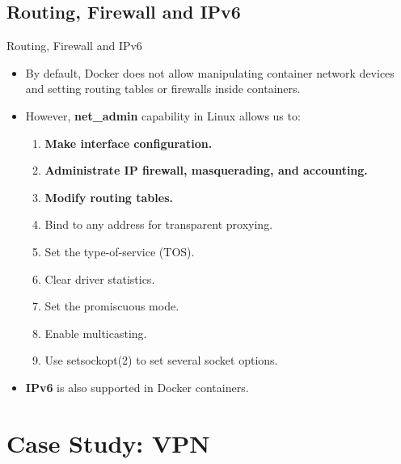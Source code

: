 \documentclass{beamer}
\begin{document}
\subsection{Routing, Firewall and IPv6}
\begin{frame}{Routing, Firewall and IPv6}
\begin{itemize}
\item By default, Docker does not allow manipulating container network devices and setting routing tables or firewalls inside containers.
\item However, \textbf{net\_admin} capability in Linux allows us to:
\begin{enumerate}
\item \textbf{Make interface configuration.}
\item \textbf{Administrate IP firewall, masquerading, and accounting.}
\item \textbf{Modify routing tables.}
\item Bind to any address for transparent proxying.
\item Set the type-of-service (TOS).
\item Clear driver statistics.
\item Set the promiscuous mode.
\item Enable multicasting.
\item Use setsockopt(2) to set several socket options.
\end{enumerate}
\item \textbf{IPv6} is also supported in Docker containers.
\end{itemize}
\end{frame}

\section{Case Study: VPN}
\end{document}
